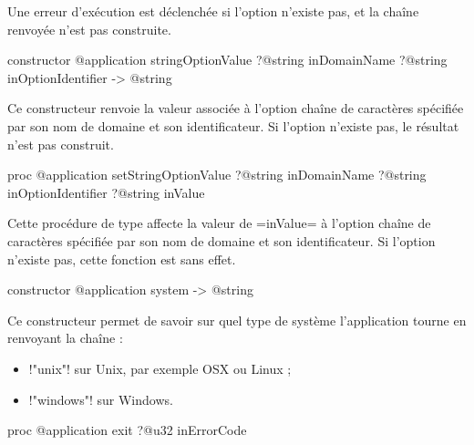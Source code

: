 Une erreur d'exécution est déclenchée si l'option n'existe pas, et la chaîne renvoyée n'est pas construite.





\begin{galgas4box}
constructor @application stringOptionValue
    ?@string inDomainName
    ?@string inOptionIdentifier -> @string
\end{galgas4box}

Ce constructeur renvoie la valeur associée à l'option chaîne de caractères spécifiée par son nom de domaine et son identificateur. Si l'option n'existe pas, le résultat n'est pas construit.






\begin{galgas4box}
proc @application setStringOptionValue
    ?@string inDomainName
    ?@string inOptionIdentifier
    ?@string inValue
\end{galgas4box}

Cette procédure de type affecte la valeur de \ggsq=inValue= à l'option chaîne de caractères spécifiée par son nom de domaine et son identificateur. Si l'option n'existe pas, cette fonction est sans effet.












\begin{galgas4box}
constructor @application system -> @string
\end{galgas4box}

Ce constructeur permet de savoir sur quel type de système l'application tourne en renvoyant la chaîne :
\begin{itemize}
  \item \ggsq!"unix"! sur Unix, par exemple OSX ou Linux ;
  \item \ggsq!"windows"! sur Windows.
\end{itemize}






\begin{galgas4box}
proc @application exit ?@u32 inErrorCode
\end{galgas4box}

